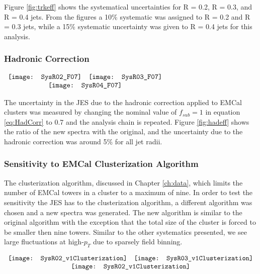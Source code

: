 \noindent
Figure \ref{fig:trkeff} shows the systematical uncertainties for R = 0.2, R = 0.3, and R = 0.4 jets.  From the figures a 10\% systematic was assigned to R = 0.2 and R = 0.3 jets, while a 15\% systematic uncertainty was given to R = 0.4 jets for this analysis.

\subsubsection{Hadronic Correction}

\begin{figure*}[t!]
$\begin{array}{rl}
    \texttt{[image: SysR02\_F07]} &
    \texttt{[image: SysR03\_F07]}\\
    \multicolumn{2}{c}{\texttt{[image: SysR04\_F07]}}
\end{array}$
\caption[Systematic due to Hadronic correction.]{\label{fig:hadeff}Systematic due to hadronic correction efficiency; R = 0.2 \textit{(top left)}, R = 0.3 \textit{(top right)}, R = 0.4 \textit{(bottom)}.}
\end{figure*}

The uncertainty in the JES due to the hadronic correction applied to EMCal clusters was measured by changing the nominal value of $f_{sub} = 1$ in equation \ref{eq:HadCorr} to 0.7 and the analysis chain is repeated.  Figure \ref{fig:hadeff} shows the ratio of the new spectra with the original, and the uncertainty due to the hadronic correction was around 5\% for all jet radii.

\subsubsection{Sensitivity to EMCal Clusterization Algorithm}
The clusterization algorithm, discussed in Chapter \ref{ch:data}, which limits the number of EMCal towers in a cluster to a maximum of nine.  In order to test the sensitivity the JES has to the clusterization algorithm, a different algorithm was chosen and a new spectra was generated.  The new algorithm is similar to the original algorithm with the exception that the total size of the cluster is forced to be smaller then nine towers.  Similar to the other systematics presented, we see large fluctuations at high-$p_{T}$ due to sparsely field binning.  

\begin{figure*}[t!]
$\begin{array}{rl}
    \texttt{[image: SysR02\_v1Clusterization]} &
    \texttt{[image: SysR03\_v1Clusterization]}\\
    \multicolumn{2}{c}{\texttt{[image: SysR02\_v1Clusterization]}}
\end{array}$
\caption[Systematic due to clusterization algorithm.]{\label{fig:cluseff}Systematic due to EMCal clusterization algorithm; R = 0.2 \textit{(top left)}, R = 0.3 \textit{(top right)}, R = 0.4 \textit{(bottom)}.}
\end{figure*}


